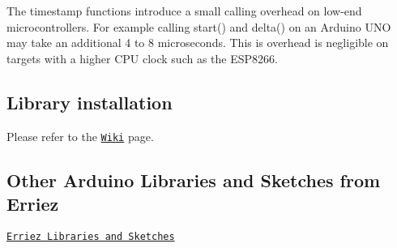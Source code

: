 The timestamp functions introduce a small calling overhead on low-\/end microcontrollers. For example calling {\ttfamily start()} and {\ttfamily delta()} on an Arduino U\+NO may take an additional 4 to 8 microseconds. This is overhead is negligible on targets with a higher C\+PU clock such as the E\+S\+P8266.

\subsection*{Library installation}

Please refer to the \href{https://github.com/Erriez/ErriezArduinoLibrariesAndSketches/wiki}{\tt Wiki} page.

\subsection*{Other Arduino Libraries and Sketches from Erriez}


\begin{DoxyItemize}
\item \href{https://github.com/Erriez/ErriezArduinoLibrariesAndSketches}{\tt Erriez Libraries and Sketches} 
\end{DoxyItemize}